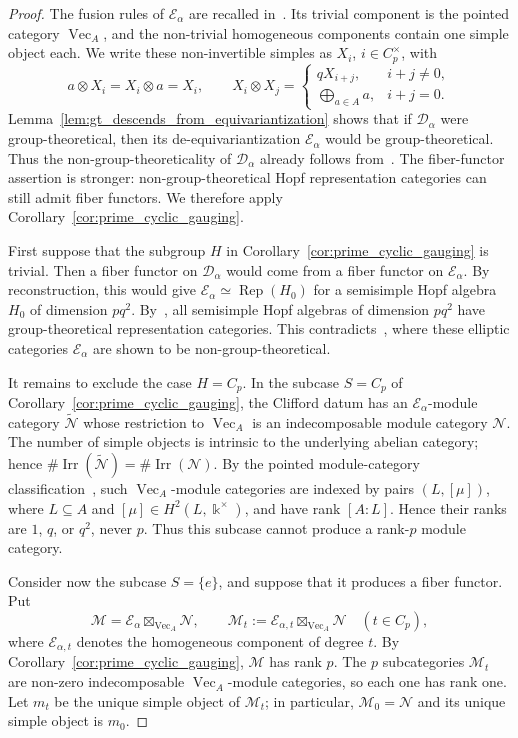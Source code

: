 \documentclass[12pt]{amsart}
\theoremstyle{plain}
\theoremstyle{definition} %
\theoremstyle{remark} %
\newcommand{\ku}{{\Bbbk}} %
\DeclareMathOperator{\VecCat}{Vec}
\newcommand{\Vect}[1]{\VecCat_{#1}}
\newcommand{\cD}{\mathcal{D}}
\newcommand{\cE}{\mathcal{E}}
\newcommand{\cM}{\mathcal{M}}
\newcommand{\cN}{\mathcal{N}}
\newcommand{\Irr}{\operatorname{Irr}}
\newcommand{\Rep}{\operatorname{Rep}}
\begin{document}
\begin{proof}
The fusion rules of $\cE_\alpha$ are recalled in~\cite[Proposition~4.1]{GPR24}. Its trivial component is the pointed category $\Vect{A}$, and the non-trivial homogeneous components contain one simple object each. We write these non-invertible simples as $X_i$, $i\in C_p^\times$, with
\[
a\otimes X_i=X_i\otimes a=X_i,\qquad
X_i\otimes X_j=
\begin{cases}
qX_{i+j},& i+j\ne0,\\
\displaystyle\bigoplus_{a\in A}a,& i+j=0.
\end{cases}
\]
Lemma~\ref{lem:gt_descends_from_equivariantization} shows that if $\cD_\alpha$ were group-theoretical, then its de-equivariantization $\cE_\alpha$ would be group-theoretical. Thus the non-group-theoreticality of $\cD_\alpha$ already follows from~\cite[Theorem~4.4]{GPR24}. The fiber-functor assertion is stronger: non-group-theoretical Hopf representation categories can still admit fiber functors. We therefore apply Corollary~\ref{cor:prime_cyclic_gauging}.

First suppose that the subgroup $H$ in Corollary~\ref{cor:prime_cyclic_gauging} is trivial. Then a fiber functor on $\cD_\alpha$ would come from a fiber functor on $\cE_\alpha$. By reconstruction, this would give $\cE_\alpha\simeq \Rep(H_0)$ for a semisimple Hopf algebra $H_0$ of dimension $pq^2$. By~\cite[Corollary~1.2]{JL09}, all semisimple Hopf algebras of dimension $pq^2$ have group-theoretical representation categories. This contradicts~\cite[Theorem~4.4]{GPR24}, where these elliptic categories $\cE_\alpha$ are shown to be non-group-theoretical.

It remains to exclude the case $H=C_p$. In the subcase $S=C_p$ of Corollary~\ref{cor:prime_cyclic_gauging}, the Clifford datum has an $\cE_\alpha$-module category $\widetilde{\cN}$ whose restriction to $\Vect{A}$ is an indecomposable module category $\cN$. The number of simple objects is intrinsic to the underlying abelian category; hence $\#\Irr(\widetilde{\cN})=\#\Irr(\cN)$. By the pointed module-category classification~\cite[Section~2]{Nik08}, such $\Vect{A}$-module categories are indexed by pairs $(L,[\mu])$, where $L\subseteq A$ and $[\mu]\in H^2(L,\ku^\times)$, and have rank $[A:L]$. Hence their ranks are $1$, $q$, or $q^2$, never $p$. Thus this subcase cannot produce a rank-$p$ module category.

Consider now the subcase $S=\{e\}$, and suppose that it produces a fiber functor. Put
\[
\cM=\cE_\alpha\boxtimes_{\Vect{A}}\cN,
\qquad
\cM_t:=\cE_{\alpha,t}\boxtimes_{\Vect{A}}\cN
\quad (t\in C_p),
\]
where $\cE_{\alpha,t}$ denotes the homogeneous component of degree $t$. By Corollary~\ref{cor:prime_cyclic_gauging}, $\cM$ has rank $p$. The $p$ subcategories $\cM_t$ are non-zero indecomposable $\Vect{A}$-module categories, so each one has rank one. Let $m_t$ be the unique simple object of $\cM_t$; in particular, $\cM_0=\cN$ and its unique simple object is $m_0$.


\end{proof}
\end{document}
